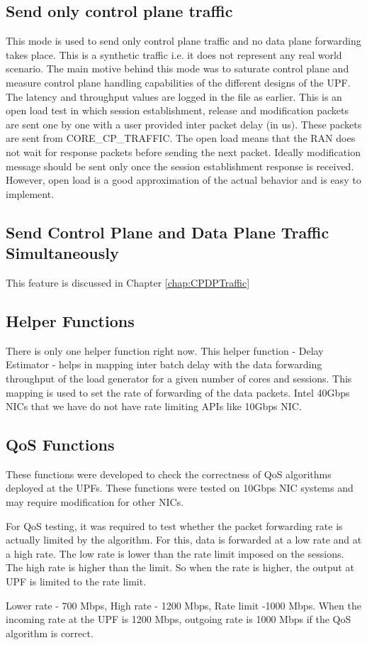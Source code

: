 \subsection{Send only control plane traffic}
This mode is used to send only control plane traffic and no data plane forwarding takes place.
This is a synthetic traffic i.e. it does not represent any real world scenario. The main motive behind this mode was to saturate control plane and measure control plane handling capabilities of the different designs of the UPF. The latency and throughput values are logged in the file as earlier.
This is an open load test in which session establishment, release and modification 
packets are sent one by one with a user provided inter packet delay (in us). These 
packets are sent from CORE\_CP\_TRAFFIC. The open load means that the RAN does not 
wait for response packets before sending the next packet.  Ideally modification 
message should be sent only once the session establishment response is received. 
However, open load is a good approximation of the actual behavior and is easy to
 implement.

\subsection{Send Control Plane and Data Plane Traffic Simultaneously}
This feature is discussed in Chapter \ref{chap:CPDPTraffic}

\subsection{Helper Functions}
There is only one helper function right now. This helper function - Delay Estimator - helps in mapping inter batch delay with the data forwarding throughput of the load generator for a given number of cores and sessions.
This mapping is used to set the rate of forwarding of the data packets. Intel 40Gbps NICs that we have do not have rate limiting APIs like 10Gbps NIC.

\subsection{QoS Functions}
These functions were developed to check the correctness of QoS algorithms deployed at the UPFs. These functions were tested on 10Gbps NIC systems and may require modification for other NICs.


For QoS testing, it was required to test whether the packet forwarding rate is actually limited by
the algorithm. For this, data is forwarded at a low rate and at a high rate. The low rate is lower than  the rate limit imposed on the sessions. The high rate is higher than the limit. So when the rate is higher, the output at UPF is limited to the rate limit.

Lower rate - 700 Mbps, High rate - 1200 Mbps, Rate limit -1000 Mbps. When the incoming rate at the UPF is 1200 Mbps, outgoing rate is 1000 Mbps if the QoS algorithm is correct.

